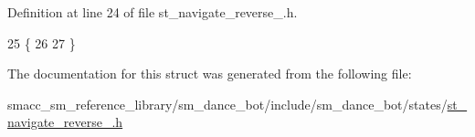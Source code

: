 Definition at line 24 of file st\+\_\+navigate\+\_\+reverse\+\_.\+h.


\begin{DoxyCode}
25    \{
26  
27    \}
\end{DoxyCode}


The documentation for this struct was generated from the following file\+:\begin{DoxyCompactItemize}
\item 
smacc\+\_\+sm\+\_\+reference\+\_\+library/sm\+\_\+dance\+\_\+bot/include/sm\+\_\+dance\+\_\+bot/states/\hyperlink{st__navigate__reverse__1_8h}{st\+\_\+navigate\+\_\+reverse\+\_.\+h}\end{DoxyCompactItemize}
